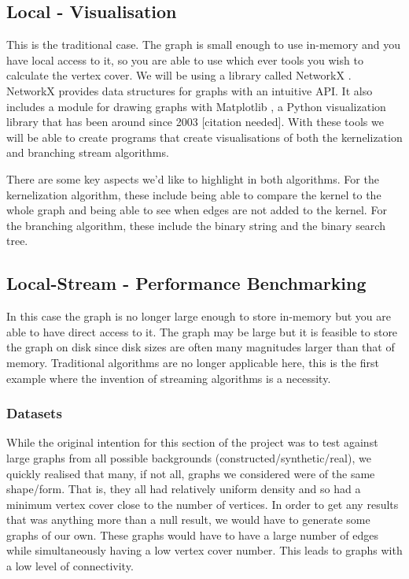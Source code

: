 \subsection{Local - Visualisation}

This is the traditional case. The graph is small enough to use in-memory
and you have local access to it, so you are able to use which ever tools
you wish to calculate the vertex cover. We will be using a library
called NetworkX \cite{hagberg2008exploring}. NetworkX provides data structures
for graphs with an intuitive API. It also includes a module for drawing
graphs with Matplotlib \cite{hunter2007matplotlib}, a Python visualization
library that has been around since 2003 [citation needed]. With these tools we will be
able to create programs that create visualisations of both the
kernelization and branching stream algorithms.

There are some key aspects we'd like to highlight in both algorithms.
For the kernelization algorithm, these include being able to compare the
kernel to the whole graph and being able to see when edges are not added
to the kernel. For the branching algorithm, these include the binary
string and the binary search tree.


\subsection{Local-Stream - Performance Benchmarking}

In this case the graph is no longer large enough to store in-memory but
you are able to have direct access to it. The graph may be large but it
is feasible to store the graph on disk since disk sizes are often many
magnitudes larger than that of memory. Traditional algorithms are no
longer applicable here, this is the first example where the invention of
streaming algorithms is a necessity.

\subsubsection{Datasets}

While the original intention for this section of the project was to test
against large graphs from all possible backgrounds
(constructed/synthetic/real), we quickly realised that many, if not all,
graphs we considered were of the same shape/form. That is, they all had
relatively uniform density and so had a minimum vertex cover close to
the number of vertices. In order to get any results that was anything
more than a null result, we would have to generate some graphs of our
own. These graphs would have to have a large number of edges while
simultaneously having a low vertex cover number. This leads to graphs
with a low level of connectivity.

